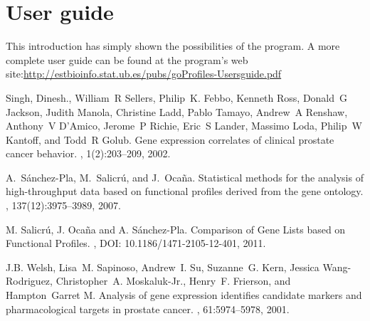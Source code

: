 \documentclass[a4paper]{article}
\begin{document}
\section{User guide}

This introduction has simply shown the possibilities of the program. A more complete user guide can be found at the program's web site:\newline \href{http://estbioinfo.stat.ub.es/pubs/goProfiles-Usersguide.pdf}{http://estbioinfo.stat.ub.es/pubs/goProfiles-Usersguide.pdf}



%
\begin{thebibliography}{10}


Singh, Dinesh., William~R Sellers, Philip~K. Febbo, Kenneth Ross, Donald~G
  Jackson, Judith Manola, Christine Ladd, Pablo Tamayo, Andrew~A Renshaw,
  Anthony~V D'Amico, Jerome~P Richie, Eric~S Lander, Massimo Loda, Philip~W
  Kantoff, and Todd~R Golub.
\newblock Gene expression correlates of clinical prostate cancer behavior.
, 1(2):203--209, 2002.

A.~S{\'a}nchez-Pla, M.~Salicr{\'u}, and J.~Oca{\~n}a.
\newblock Statistical methods for the analysis of high-throughput data based on
  functional profiles derived from the gene ontology.
, 137(12):3975--3989, 2007. 

  M. Salicr{\'u}, J. Oca{\~n}a and A. S{\'a}nchez-Pla.
\newblock Comparison of Gene Lists based on Functional Profiles.
, DOI: 10.1186/1471-2105-12-401, 2011.

J.B. Welsh, Lisa~M. Sapinoso, Andrew~I. Su, Suzanne~G. Kern, Jessica
  Wang-Rodriguez, Christopher~A. Moskaluk-Jr., Henry~F. Frierson, and
  Hampton~Garret M.
\newblock Analysis of gene expression identifies candidate markers and
  pharmacological targets in prostate cancer.
, 61:5974--5978, 2001.

\end{thebibliography}
\end{document}
